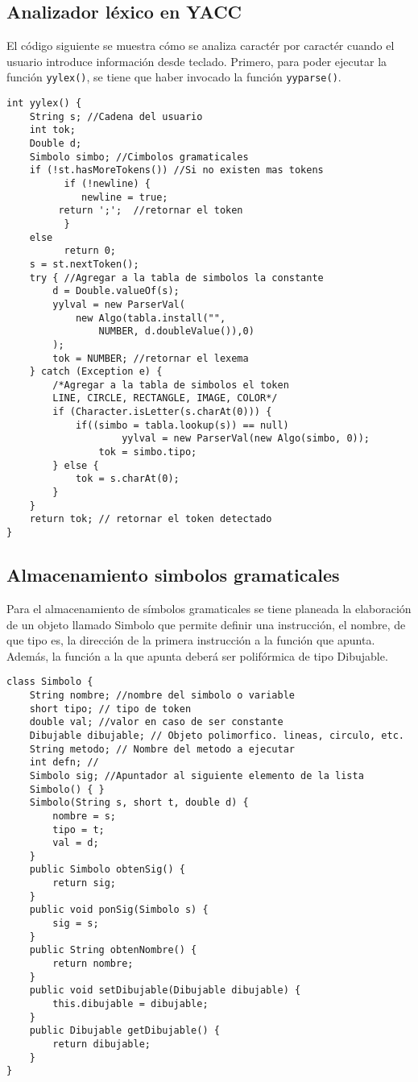 \subsection{Analizador léxico en YACC}
El código siguiente se muestra cómo se analiza caractér por caractér 
cuando el usuario introduce información desde teclado. Primero, para poder
ejecutar la función \texttt{yylex()}, se tiene que haber invocado la función
 \texttt{yyparse()}.
\begin{lstlisting}
int yylex() {
	String s; //Cadena del usuario
	int tok;
	Double d;
	Simbolo simbo; //Cimbolos gramaticales
	if (!st.hasMoreTokens()) //Si no existen mas tokens
	      if (!newline) {
        	 newline = true; 
		 return ';';  //retornar el token
	      }
	else
	      return 0;
	s = st.nextToken();
	try { //Agregar a la tabla de simbolos la constante
		d = Double.valueOf(s);
		yylval = new ParserVal(
			new Algo(tabla.install("", 
				NUMBER, d.doubleValue()),0) 
		);
		tok = NUMBER; //retornar el lexema
	} catch (Exception e) {
	    /*Agregar a la tabla de simbolos el token
		LINE, CIRCLE, RECTANGLE, IMAGE, COLOR*/
		if (Character.isLetter(s.charAt(0))) {
			if((simbo = tabla.lookup(s)) == null)
        			yylval = new ParserVal(new Algo(simbo, 0));
		      	tok = simbo.tipo;
		} else {
			tok = s.charAt(0);
		}
	}
	return tok; // retornar el token detectado
}
\end{lstlisting}

\subsection{Almacenamiento simbolos gramaticales}
Para el almacenamiento de símbolos gramaticales se tiene planeada la 
elaboración de un objeto llamado Simbolo que permite definir una 
instrucción, el nombre, de que tipo es, la dirección de la primera
instrucción a la función que apunta. Además, la función a la que apunta 
deberá ser polifórmica de tipo Dibujable.

\begin{lstlisting}
class Simbolo {
	String nombre; //nombre del simbolo o variable
	short tipo;	// tipo de token
	double val; //valor en caso de ser constante
	Dibujable dibujable; // Objeto polimorfico. lineas, circulo, etc.
	String metodo; // Nombre del metodo a ejecutar
	int defn; // 
	Simbolo sig; //Apuntador al siguiente elemento de la lista
	Simbolo() { }
	Simbolo(String s, short t, double d) {
		nombre = s;
		tipo = t;
		val = d;
	}
    public Simbolo obtenSig() {
		return sig;
	}
    public void ponSig(Simbolo s) {
		sig = s;
	}
    public String obtenNombre() {
		return nombre;
	}
	public void setDibujable(Dibujable dibujable) {
		this.dibujable = dibujable;
	}
	public Dibujable getDibujable() {
		return dibujable;
	}
}
\end{lstlisting}

